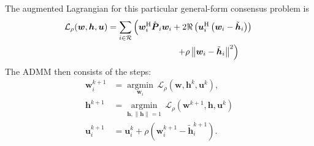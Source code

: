 \documentclass{article}
\newcommand{\hf}{{\bm{h}}}
\newcommand{\wf}{{\bm{w}}}
\newcommand{\uuf}{{\bm{u}}}
\newcommand{\aRhof}{{\bm{{P}}}}
\newcommand{\I}{\mtxb{I}}
\newcommand{\Mset}{\mathcal{M}}
\newcommand{\Rset}{\mathcal{R}}
\begin{document}
The augmented Lagrangian for this particular general-form consensus problem is
\begin{align}
    \mathcal{L}_{\rho} (\wf,\hf,\uuf) &= \sum_{i \in \Rset} \left( \wf_i^\herm \hat{\aRhof}_i \wf_i + 2 \Re \left( \uuf_i^{\herm} \left(\wf_i - \tilde{\hf}_i\right) \right)\right. \vphantom{+ \rho \left\| \wf_i - \tilde{\hf}_i \right\|} \nonumber\\
    \vphantom{\wf_i^\herm \hat{\aRhof}_i \wf_i + 2 \Re \left( \uuf_i^{\herm} \left(\wf_i - \tilde{\hf}_i\right) \right)} & \qquad \qquad \qquad \qquad \left.+ \rho \left\| \wf_i - \tilde{\hf}_i \right\|^2 \right)\label{eq:general_consensus_admm:lagrangian}
\end{align}
The ADMM then consists of the steps:
\begin{align}
    \wf_i^{k+1} &= \underset{\wf_i}{\operatorname{argmin}} \, \mathcal{L}_{\rho} (\wf,\hf^k,\uuf^k),\label{eq:general_consensus_admm:local}\\
    \hf^{k+1} &= \underset{\hf, \|\hf\| = 1}{\operatorname{argmin}}\, \mathcal{L}_{\rho} (\wf^{k+1},\hf,\uuf^k)\label{eq:general_consensus_admm:global}\\
    \uuf_i^{k+1} &= \uuf_i^{k} + \rho \left( \wf_i^{k+1} - \tilde{\hf}_i^{k+1} \right).\label{eq:general_consensus_admm:dual}
\end{align}
\end{document}
